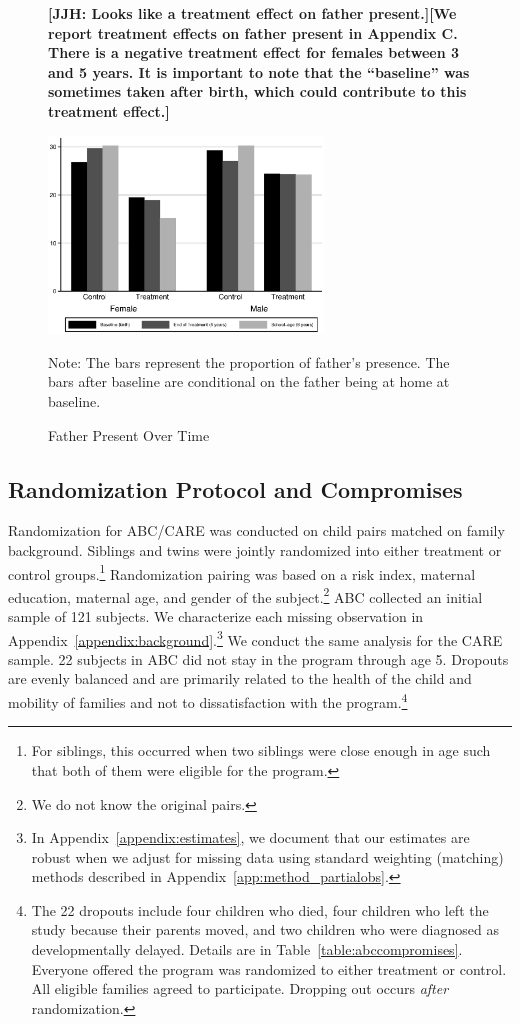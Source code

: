 \begin{figure}[H]
\textbf{[JJH: Looks like a treatment effect on father present.][We report treatment effects on father present in Appendix C. There is a negative treatment effect for females between 3 and 5 years. It is important to note that the ``baseline'' was sometimes taken after birth, which could contribute to this treatment effect.]}
\begin{center}
\caption{Father Present Over Time}
\label{fig:family-over-time}
		\label{fig:fhome}
			\includegraphics[width=0.65\textwidth]{output/family-fhome}
\end{center}
\footnotesize \justify
Note: The bars represent the proportion of father's presence. The bars after baseline are conditional on the father being at home at baseline.
\end{figure}

\subsection{Randomization Protocol and Compromises} \label{section:randomization}

Randomization for ABC/CARE was conducted on child pairs matched on family background. Siblings and twins were jointly randomized into either treatment or control groups.\footnote{For siblings, this occurred when two siblings were close enough in age such that both of them were eligible for the program.} Randomization pairing was based on a risk index, maternal education, maternal age, and gender of the subject.\footnote{We do not know the original pairs.} ABC collected an initial sample of 121 subjects. We characterize each missing observation in Appendix~\ref{appendix:background}.\footnote{In Appendix~\ref{appendix:estimates}, we document that our estimates are robust when we adjust for missing data using standard weighting (matching) methods described in Appendix~\ref{app:method_partialobs}.} We conduct the same analysis for the CARE sample. 22 subjects in ABC did not stay in the program through age 5. Dropouts are evenly balanced and are primarily related to the health of the child and mobility of families and not to dissatisfaction with the program.\footnote{The 22 dropouts include four children who died, four children who left the study because their parents moved, and two children who were diagnosed as developmentally delayed. Details are in Table~\ref{table:abccompromises}. Everyone offered the program was randomized to either treatment or control. All eligible families agreed to participate. Dropping out occurs \emph{after} randomization.}


